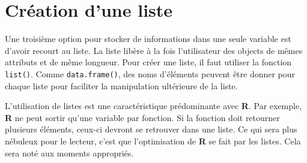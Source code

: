\documentclass[
]{book}
\newenvironment{Shaded}{}{}
\newcommand{\AttributeTok}[1]{#1}
\newcommand{\CommentTok}[1]{\textit{#1}}
\newcommand{\DecValTok}[1]{#1}
\newcommand{\FunctionTok}[1]{#1}
\newcommand{\NormalTok}[1]{#1}
\newcommand{\OtherTok}[1]{#1}
\newcommand{\SpecialCharTok}[1]{#1}
\newcommand{\StringTok}[1]{#1}
\begin{document}
\hypertarget{cruxe9ation-dune-liste}{%
\section{Création d'une liste}\label{cruxe9ation-dune-liste}}

Une troisième option pour stocker de informations dans une seule variable est d'avoir recourt au liste. La liste libère à la fois l'utilisateur des objects de mêmes attributs et de même longueur. Pour créer une liste, il faut utiliser la fonction \texttt{list()}. Comme \texttt{data.frame()}, des noms d'éléments peuvent être donner pour chaque liste pour faciliter la manipulation ultérieure de la liste.

\begin{Shaded}
\end{Shaded}

L'utilisation de listes est une caractéristique prédominante avec \textbf{R}. Par exemple, \textbf{R} ne peut sortir qu'une variable par fonction. Si la fonction doit retourner plusieurs éléments, ceux-ci devront se retrouver dans une liste. Ce qui sera plus nébuleux pour le lecteur, c'est que l'optimisation de \textbf{R} se fait par les listes. Cela sera noté aux moments appropriés.
\end{document}
